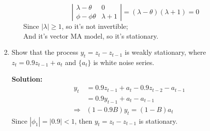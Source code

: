 \documentclass{article}
\begin{document}
\begin{enumerate}
\begin{itemize}
\begin{equation*}
		\end{equation*}
		\begin{equation*}
		\left| \begin{array}{cc}{\lambda-\theta} & {0} \\ {\phi-\phi \theta} & {\lambda+1}\end{array}\right|=(\lambda-\theta)(\lambda+1)=0
		\end{equation*}
		Since $|\lambda| \geq 1$, so it's not invertible;\\
		And it's vector MA model, so it's stationary.
	\end{itemize}
	
	\item Show that the process $y_{t}=z_{t}-z_{t-1}$ is weakly stationary, where $z_{t}=0.9 z_{t-1}+a_{t}$ and $\{a_t\}$ is white noise series.
	
	\textbf{Solution:}
	\begin{equation*}
	\begin{aligned} y_{t} &=0.9 z_{t-1}+a_{t}-0.9 z_{t-2}-a_{t-1} \\ &=0.9 y_{t-1}+a_{t}-a_{t-1}\\ \Rightarrow &(1-0.9 B) y_{t}=(1-B) a_{t} \end{aligned}
	\end{equation*}
	Since $\left|\phi_{1}\right|=|0.9|<1$, then $y_{t}=z_{t}-z_{t-1}$ is stationary.
\end{enumerate}
\end{document}
